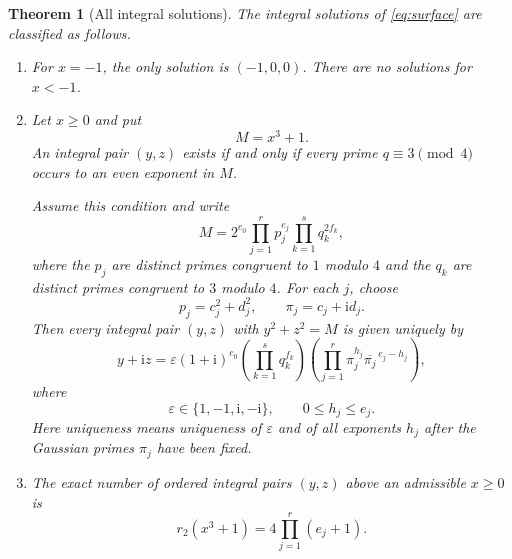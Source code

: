 \documentclass[11pt,a4paper]{article}
\numberwithin{equation}{section}
\newtheorem{theorem}{Theorem}[section]
\theoremstyle{definition}
\newcommand{\conj}[1]{\overline{#1}}
\newcommand{\ii}{\mathrm{i}}
\begin{document}
\begin{theorem}[All integral solutions]
\label{thm:integer-classification}
The integral solutions of \eqref{eq:surface} are classified as follows.

\begin{enumerate}
\item For $x=-1$, the only solution is $(-1,0,0)$. There are no solutions for $x<-1$.

\item Let $x\ge0$ and put
\[
 M=x^3+1.
\]
An integral pair $(y,z)$ exists if and only if every prime $q\equiv3\pmod4$ occurs to an even exponent in $M$.

Assume this condition and write
\begin{equation}
 M=2^{e_0}
 \prod_{j=1}^{r}p_j^{e_j}
 \prod_{k=1}^{s}q_k^{2f_k},
 \label{eq:M-factorization}
\end{equation}
where the $p_j$ are distinct primes congruent to $1$ modulo $4$ and the $q_k$ are distinct primes congruent to $3$ modulo $4$. For each $j$, choose
\[
 p_j=c_j^2+d_j^2,
 \qquad
 \pi_j=c_j+\ii d_j.
\]
Then every integral pair $(y,z)$ with $y^2+z^2=M$ is given uniquely by
\begin{equation}
 \boxed{
 y+\ii z=
 \varepsilon(1+\ii)^{e_0}
 \left(\prod_{k=1}^{s}q_k^{f_k}\right)
 \left(\prod_{j=1}^{r}
 \pi_j^{h_j}\conj{\pi_j}^{\,e_j-h_j}
 \right),
 }
 \label{eq:all-integer-representations}
\end{equation}
where
\begin{equation}
 \varepsilon\in\{1,-1,\ii,-\ii\},
 \qquad
 0\le h_j\le e_j.
 \label{eq:integer-parameters}
\end{equation}
Here uniqueness means uniqueness of $\varepsilon$ and of all exponents $h_j$ after the Gaussian primes $\pi_j$ have been fixed.

\item The exact number of ordered integral pairs $(y,z)$ above an admissible $x\ge0$ is
\begin{equation}
 \boxed{
 r_2(x^3+1)=4\prod_{j=1}^{r}(e_j+1).
 }
 \label{eq:r2-count}
\end{equation}
\end{enumerate}
\end{theorem}
\end{document}
